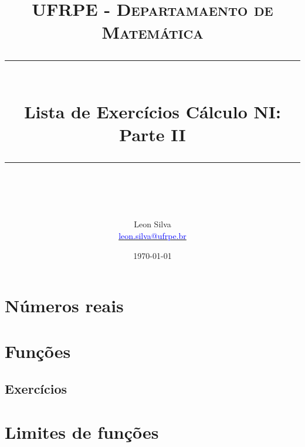\documentclass[paper=a4, fontsize=11pt]{scrartcl} %
\begin{document}
\newcommand{\horrule}[1]{\rule{\linewidth}{#1}} %

\title{	
\normalfont \normalsize 
\textsc{UFRPE - Departamaento de Matemática} \\ [25pt] %
\horrule{0.5pt} \\[0.1cm] %
\huge Lista de Exercícios Cálculo NI: Parte II \\ %
\horrule{2pt} \\[0.5cm] %
}

\author{Leon Silva\\\href{mailto:leon.silva@ufrpe.br}{\textcolor{blue}{leon.silva@ufrpe.br}}} %

\date{\normalsize\today} %



\maketitle %

\section{Números reais}

\section{Funções}






\subsection{Exercícios}


\section{Limites de funções}

\end{document}
